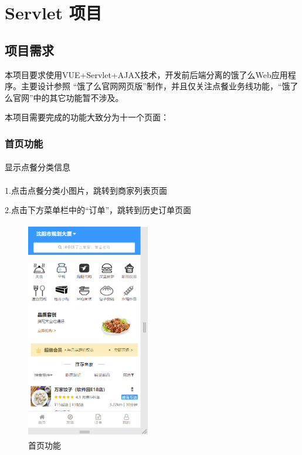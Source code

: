 
\chapter{Servlet 项目}

\section{项目需求}

本项目要求使用VUE+Servlet+AJAX技术，开发前后端分离的饿了么Web应用程序。主要设计参照 “饿了么官网网页版”制作，并且仅关注点餐业务线功能，“饿了么官网”中的其它功能暂不涉及。

本项目需要完成的功能大致分为十一个页面：~\\

\subsection{首页功能}
\subsubsection*{}
显示点餐分类信息
\subsubsection*{}
1.点击点餐分类小图片，跳转到商家列表页面

2.点击下方菜单栏中的“订单”，跳转到历史订单页面
\begin{figure}[H]
    \centering
    \includegraphics[width=5.4cm,height=9.6cm]{figures/3.1.1.png}
    \caption{首页功能}
\end{figure}

